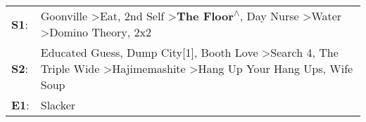 \begin{supertabular}{p{0.03\textwidth}p{0.92\textwidth}}
 \textbf{S1}:  &                Goonville\textsuperscript{} \textgreater \enspace Eat\textsuperscript{}, \enspace 2nd Self\textsuperscript{} \textgreater \enspace \textbf{The Floor\textsuperscript{$\wedge$}}, \enspace Day Nurse\textsuperscript{} \textgreater \enspace Water\textsuperscript{} \textgreater \enspace Domino Theory\textsuperscript{}, \enspace 2x2\textsuperscript{}  \enspace  \\
 \textbf{S2}:  &  Educated Guess\textsuperscript{}, \enspace Dump City[1]\textsuperscript{}, \enspace Booth Love\textsuperscript{} \textgreater \enspace Search 4\textsuperscript{}, \enspace The Triple Wide\textsuperscript{} \textgreater \enspace Hajimemashite\textsuperscript{} \textgreater \enspace Hang Up Your Hang Ups\textsuperscript{}, \enspace Wife Soup\textsuperscript{}  \enspace  \\
 \textbf{E1}:  &                                                                                                                                                                                                                                                                                                                                                Slacker\textsuperscript{}  \enspace  \\
\end{supertabular}
